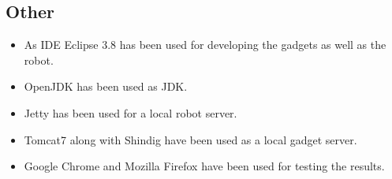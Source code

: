 \subsection{Other}
\begin{itemize}
  \item As IDE Eclipse 3.8 has been used for developing the gadgets as well as the robot.
  \item OpenJDK has been used as JDK.
  \item Jetty has been used for a local robot server.
  \item Tomcat7 along with Shindig have been used as a local gadget server.
  \item Google Chrome and Mozilla Firefox have been used for testing the results.
\end{itemize}
